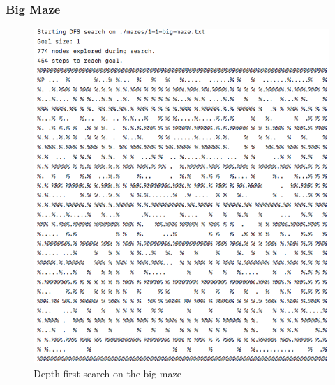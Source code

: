 \documentclass[titlepage]{article}
\begin{document}
\subsubsection{Big Maze}
\begin{figure}[h!]
\includegraphics[width=\linewidth]{dfsbig.png}
\caption{Depth-first search on the big maze}
\label{fig:DFSbig}
\end{figure}

\newpage
\end{document}
